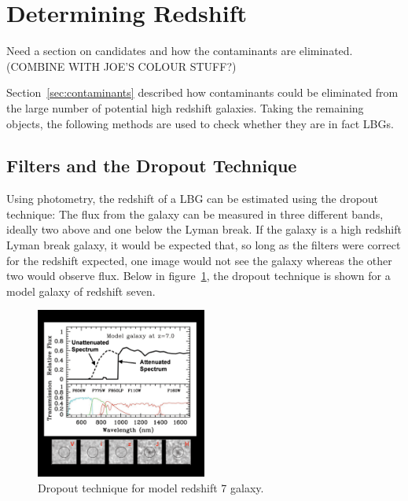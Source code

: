
\section{Determining Redshift} %
\label{sub:determingin_redshift}
	Need a section on candidates and how the contaminants are eliminated.
	(COMBINE WITH JOE’S COLOUR STUFF?)

	Section~\ref{sec:contaminants} described how contaminants could be eliminated from the large number of potential high redshift galaxies. Taking the remaining objects, the following methods are used to check whether they are in fact LBGs.

	\subsection{Filters and the Dropout Technique} %
		\label{ssub:filters_and_the_dropout_technique}
		Using photometry, the redshift of a LBG can be estimated using the dropout technique: The flux from the galaxy can be measured in three different bands, ideally two above and one below the Lyman break. If the galaxy is a high redshift Lyman break galaxy, it would be expected that, so long as the filters were correct for the redshift expected, one image would not see the galaxy whereas the other two would observe flux. Below in figure~\ref{fig:drop_out_at_z7}, the dropout technique is shown for a model galaxy of redshift seven.
		\begin{figure}[ht]
			\centering
			\includegraphics[width=0.5\textwidth]{../Images/drop_out_at_z7.png}
			\caption{Dropout technique for model redshift 7 galaxy\cite{first_galaxies_dropout_at_z7}.\label{fig:drop_out_at_z7}}
		\end{figure}

